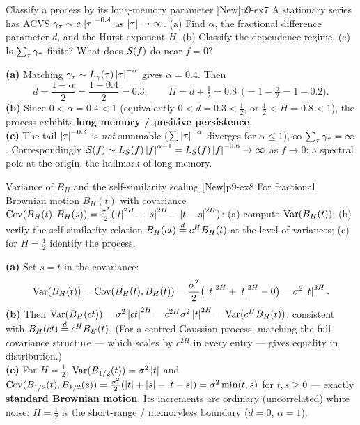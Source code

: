 \begin{exercise}{Classify a process by its long-memory parameter \quad\textnormal{[New]}}{p9-ex7}
A stationary series has ACVS $\gamma_\tau\sim c\,\left\lvert \tau \right\rvert^{-0.4}$ as
$\left\lvert \tau \right\rvert\to\infty$. (a) Find $\alpha$, the fractional difference parameter $d$,
and the Hurst exponent $H$. (b) Classify the dependence regime. (c) Is
$\sum_\tau\gamma_\tau$ finite? What does $\mathcal{S}(f)$ do near $f=0$?
\end{exercise}
\begin{solution}
\textbf{(a)} Matching $\gamma_\tau\sim L_\gamma(\tau)\left\lvert \tau \right\rvert^{-\alpha}$ gives
$\alpha=0.4$. Then
\[
d=\frac{1-\alpha}{2}=\frac{1-0.4}{2}=0.3,\qquad
H=d+\tfrac12=0.8\ \ \big(=1-\tfrac{\alpha}{2}=1-0.2\big).
\]
\textbf{(b)} Since $0<\alpha=0.4<1$ (equivalently $0<d=0.3<\tfrac12$, or
$\tfrac12<H=0.8<1$), the process exhibits \textbf{long memory / positive
persistence}.\\
\textbf{(c)} The tail $\left\lvert \tau \right\rvert^{-0.4}$ is \emph{not} summable
($\sum\left\lvert \tau \right\rvert^{-\alpha}$ diverges for $\alpha\le1$), so
$\sum_\tau\gamma_\tau=\infty$. Correspondingly $\mathcal{S}(f)\sim L_S(f)\left\lvert f \right\rvert^{\alpha-1}=L_S(f)\left\lvert f \right\rvert^{-0.6}\to\infty$ as $f\to0$: a spectral pole at the
origin, the hallmark of long memory.
\end{solution}

\begin{exercise}{Variance of $B_H$ and the self-similarity scaling \quad\textnormal{[New]}}{p9-ex8}
For fractional Brownian motion $B_H(t)$ with covariance
$\operatorname{Cov}(B_H(t),B_H(s))=\frac{\sigma^2}{2}(\left\lvert t \right\rvert^{2H}+\left\lvert s \right\rvert^{2H}-\left\lvert t-s \right\rvert^{2H})$:
(a) compute $\operatorname{Var}(B_H(t))$; (b) verify the self-similarity relation
$B_H(ct)\overset{d}{=} c^H B_H(t)$ at the level of variances; (c) for $H=\tfrac12$
identify the process.
\end{exercise}
\begin{solution}
\textbf{(a)} Set $s=t$ in the covariance:
\[
\operatorname{Var}(B_H(t))=\operatorname{Cov}(B_H(t),B_H(t))
=\frac{\sigma^2}{2}\big(\left\lvert t \right\rvert^{2H}+\left\lvert t \right\rvert^{2H}-0\big)
=\sigma^2\left\lvert t \right\rvert^{2H}.
\]
\textbf{(b)} Then $\operatorname{Var}(B_H(ct))=\sigma^2\left\lvert ct \right\rvert^{2H}=c^{2H}\sigma^2\left\lvert t \right\rvert^{2H}
=\operatorname{Var}(c^H B_H(t))$, consistent with $B_H(ct)\overset{d}{=} c^H B_H(t)$. (For a centred
Gaussian process, matching the full covariance structure --- which scales by
$c^{2H}$ in every entry --- gives equality in distribution.)\\
\textbf{(c)} For $H=\tfrac12$, $\operatorname{Var}(B_{1/2}(t))=\sigma^2\left\lvert t \right\rvert$ and
$\operatorname{Cov}(B_{1/2}(t),B_{1/2}(s))=\frac{\sigma^2}{2}(\left\lvert t \right\rvert+\left\lvert s \right\rvert-\left\lvert t-s \right\rvert)
=\sigma^2\min(t,s)$ for $t,s\ge0$ --- exactly \textbf{standard Brownian motion}.
Its increments are ordinary (uncorrelated) white noise: $H=\tfrac12$ is the
short-range / memoryless boundary ($d=0$, $\alpha=1$).
\end{solution}

